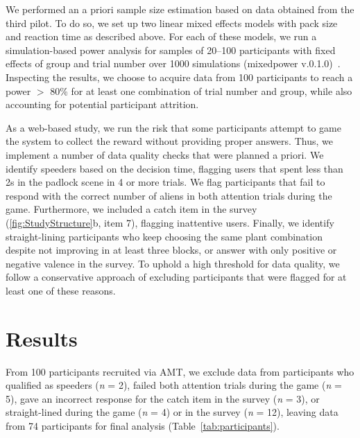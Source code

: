 We performed an a priori sample size estimation based on data obtained from the third pilot. 
To do so, we set up two linear mixed effects models with pack size and reaction time as described above. 
For each of these models, we run a simulation-based power analysis for samples of 20--100 participants with fixed effects of group and trial number over 1000 simulations (mixedpower v.0.1.0)~\citep{kumle_estimating_2021}. 
Inspecting the results, we choose to acquire data from 100 participants to reach a power $>$ 80\% for at least one combination of trial number and group, while also accounting for potential participant attrition.

As a web-based study, we run the risk that some participants attempt to game the system to collect the reward without providing proper answers. 
Thus, we implement a number of data quality checks that were planned a priori.
We identify speeders based on the decision time, flagging users that spent less than 2s in the padlock scene in 4 or more trials.
We flag participants that fail to respond with the correct number of aliens in both attention trials during the game.
Furthermore, we included a catch item in the survey (\ref{fig:StudyStructure}b, item 7), flagging inattentive users.
Finally, we identify straight-lining participants who keep choosing the same plant combination despite not improving in at least three blocks, or answer with only positive or negative valence in the survey.
To uphold a high threshold for data quality, we follow a conservative approach of excluding participants that were flagged for at least one of these reasons.

\section{Results}\label{sec:results}

From 100 participants recruited via \gls{AMT}, we exclude data from participants who qualified as speeders (\textit{n} = 2), failed both attention trials during the game (\textit{n} = 5), gave an incorrect response for the catch item in the survey (\textit{n} = 3), or straight-lined during the game (\textit{n} = 4) or in the survey (\textit{n} = 12), leaving data from 74 participants for final analysis (Table~\ref{tab:participants}).

